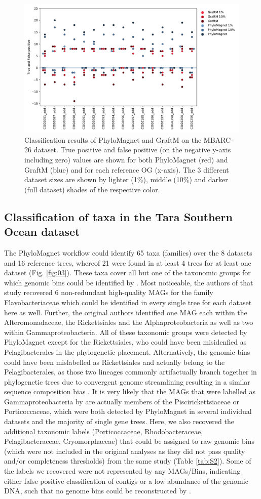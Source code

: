 \documentclass{bioinfo}
\begin{document}
\begin{figure}[!tpb]%
\centerline{\includegraphics[width=.45\textwidth]{Fig2.pdf}}
\caption{Classification results of PhyloMagnet and GraftM on the MBARC-26 dataset. True positive and false positive (on the negative y-axis including zero) values are shown for both PhyloMagnet (red) and GraftM (blue) and for each reference OG (x-axis). The 3 different dataset sizes are shown by lighter (1\%), middle (10\%) and darker (full dataset) shades of the respective color.} \label{fig:02}
\end{figure}

\subsection{Classification of taxa in the Tara Southern Ocean dataset}
The PhyloMagnet workflow could identify 65 taxa (families) over the 8 datasets and 16 reference trees, whereof 21 were found in at least 4 trees for at least one dataset (Fig. \ref{fig:03}). These taxa cover all but one of the taxonomic groups for which genomic bins could be identified by \citet[][marked with an asterisk in Fig. \ref{fig:03}]{Delmont2018}. Most noticeable, the authors of that study recovered 6 non-redundant high-quality MAGs for the family Flavobacteriaceae which could be identified in every single tree for each dataset here as well. Further, the original authors identified one MAG each within the Alteromonadaceae, the Rickettsiales and the Alphaproteobacteria as well as two within Gammaproteobacteria. All of these taxonomic groups were detected by PhyloMagnet except for the Rickettsiales, who could have been misidenfied as Pelagibacterales in the phylogenetic placement. Alternatively, the genomic bins could have been mislabelled as Rickettsiales and actually belong to the Pelagibacterales, as those two lineages commonly artifactually branch together in phylogenetic trees due to convergent genome streamlining resulting in a similar sequence composition bias \citep{Roger2017,Martijn2018,Rodriguez-Ezpeleta2012,Viklund2013}. It is very likely that the MAGs that were labelled as Gammaproteobacteria by \citet{Delmont2018} are actually members of the Piscirickettsiaceae or Porticoccaceae, which were both detected by PhyloMagnet in several individual datasets and the majority of single gene trees. Here, we also recovered the additional taxonomic labels (Porticoccaceae, Rhodobacteraceae, Pelagibacteraceae, Cryomorphaceae) that could be assigned to raw genomic bins (which were not included in the original analyses as they did not pass quality and/or completeness thresholds) from the same study (Table \ref{tab:S2}). Some of the labels we recovered were not represented by any MAGs/Bins, indicating either false positive classification of contigs or a low abundance of the genomic DNA, such that no genome bins could be reconstructed by \citet{Delmont2018}.
\end{document}
